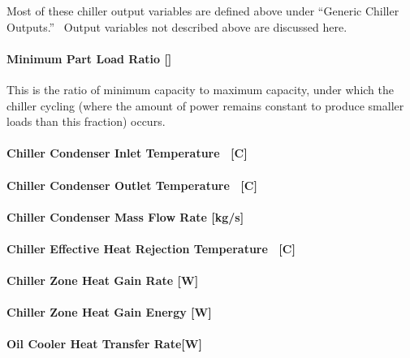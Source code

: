 Most of these chiller output variables are defined above under ``Generic Chiller Outputs.''~ Output variables not described above are discussed here.

\paragraph{Minimum Part Load Ratio {[]}}\label{chiller205-minimum-plr}

This is the ratio of minimum capacity to maximum capacity, under which the chiller cycling (where the amount of power remains constant to produce smaller loads than this fraction) occurs.

\paragraph{Chiller Condenser Inlet Temperature ~{[}C{]}}\label{chiller205-condenser-inlet-temperature-c}

\paragraph{Chiller Condenser Outlet Temperature ~{[}C{]}}\label{chiller205-condenser-outlet-temperature-c}

\paragraph{Chiller Condenser Mass Flow Rate {[}kg/s{]}}\label{chiller-condenser-mass-flow-rate}

\paragraph{Chiller Effective Heat Rejection Temperature ~{[}C{]}}\label{chiller-effective-heat-rejection-temperature}

\paragraph{Chiller Zone Heat Gain Rate {[}W{]}}\label{chiller-zone-heat-gain-rate}

\paragraph{Chiller Zone Heat Gain Energy {[}W{]}}\label{chiller-zone-heat-gain-energy}

\paragraph{Oil Cooler Heat Transfer Rate{[}W{]}}\label{chiller205-oil-cooler-heat-transfer-rate}

